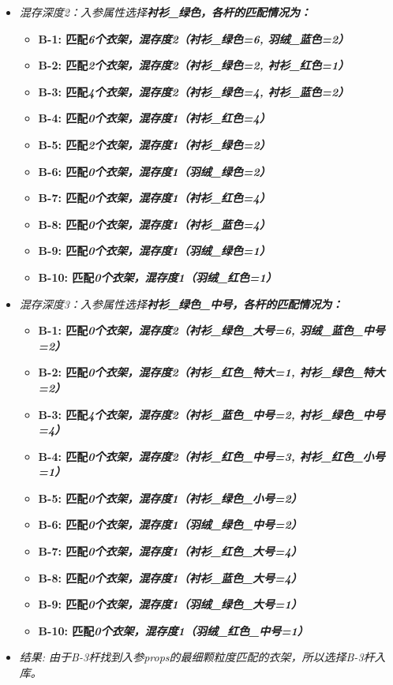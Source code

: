\begin{enumerate}[leftmargin=32pt,label=\bf{增强\Roman*.}]
\begin{itemize}
\begin{itemize}
\begin{itemize}
				\item \bf{B-9}:  匹配\it{0}个衣架，混存度1（羽绒=1）
				\item \bf{B-10}: 匹配\it{0}个衣架，混存度1（羽绒=1）
			\end{itemize}
			\item \it{混存深度2}：入参属性选择\bf{衬衫\_绿色}，各杆的匹配情况为：
			\begin{itemize}
				\item \bf{B-1}:  匹配\it{6}个衣架，混存度2（衬衫\_绿色=6, 羽绒\_蓝色=2）
				\item \bf{B-2}:  匹配\it{2}个衣架，混存度2（衬衫\_绿色=2, 衬衫\_红色=1）
				\item \bf{B-3}:  匹配\it{4}个衣架，混存度2（衬衫\_绿色=4, 衬衫\_蓝色=2）
				\item \bf{B-4}:  匹配\it{0}个衣架，混存度1（衬衫\_红色=4）
				\item \bf{B-5}:  匹配\it{2}个衣架，混存度1（衬衫\_绿色=2）
				\item \bf{B-6}:  匹配\it{0}个衣架，混存度1（羽绒\_绿色=2）
				\item \bf{B-7}:  匹配\it{0}个衣架，混存度1（衬衫\_红色=4）
				\item \bf{B-8}:  匹配\it{0}个衣架，混存度1（衬衫\_蓝色=4）
				\item \bf{B-9}:  匹配\it{0}个衣架，混存度1（羽绒\_绿色=1）
				\item \bf{B-10}: 匹配\it{0}个衣架，混存度1（羽绒\_红色=1）
			\end{itemize}
			\item \it{混存深度3}：入参属性选择\bf{衬衫\_绿色\_中号}，各杆的匹配情况为：
			\begin{itemize}
				\item \bf{B-1}:  匹配\it{0}个衣架，混存度2（衬衫\_绿色\_大号=6, 羽绒\_蓝色\_中号=2）
				\item \bf{B-2}:  匹配\it{0}个衣架，混存度2（衬衫\_红色\_特大=1, 衬衫\_绿色\_特大=2）
				\item \bf{B-3}:  匹配\it{4}个衣架，混存度2（衬衫\_蓝色\_中号=2, 衬衫\_绿色\_中号=4）
				\item \bf{B-4}:  匹配\it{0}个衣架，混存度2（衬衫\_红色\_中号=3, 衬衫\_红色\_小号=1）
				\item \bf{B-5}:  匹配\it{0}个衣架，混存度1（衬衫\_绿色\_小号=2）
				\item \bf{B-6}:  匹配\it{0}个衣架，混存度1（羽绒\_绿色\_中号=2）
				\item \bf{B-7}:  匹配\it{0}个衣架，混存度1（衬衫\_红色\_大号=4）
				\item \bf{B-8}:  匹配\it{0}个衣架，混存度1（衬衫\_蓝色\_大号=4）
				\item \bf{B-9}:  匹配\it{0}个衣架，混存度1（羽绒\_绿色\_大号=1）
				\item \bf{B-10}: 匹配\it{0}个衣架，混存度1（羽绒\_红色\_中号=1）
			\end{itemize}
			\item \it{结果}: 由于B-3杆找到入参props的最细颗粒度匹配的衣架，所以选择B-3杆入库。\par


\end{itemize}
\end{itemize}
\end{enumerate}

